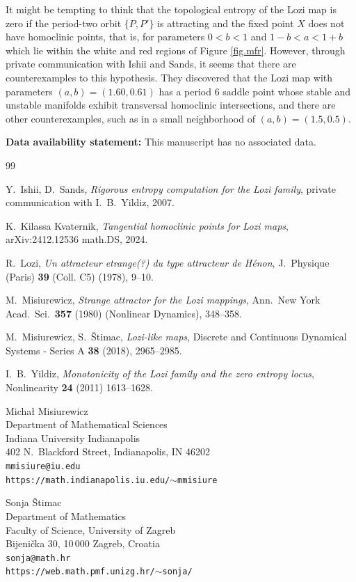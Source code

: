 \documentclass[12pt]{amsart}
\theoremstyle{plain}
\theoremstyle{definition}
\begin{document}
It might be tempting to think that the topological entropy of the Lozi map 
is zero if the period-two orbit $\{ P, P' \}$ is attracting and the fixed 
point $X$ does not have homoclinic points, that is, for parameters $0 < b < 1$ 
and $1 - b < a < 1 + b$ which lie within the white and red regions of 
Figure \ref{fig.mfr}. However, through private communication with Ishii and 
Sands, it seems that there are counterexamples to this hypothesis. They 
discovered that the Lozi map with parameters $(a, b) = (1.60, 0.61)$ has a 
period 6 saddle point whose stable and unstable manifolds exhibit transversal 
homoclinic intersections, and there are other counterexamples, such as in 
a small neighborhood of $(a, b) = (1.5, 0.5)$.

\vspace{1cm}
	
	{\bf Data availability statement:} This manuscript has no associated data.
	
\vspace{1cm}	
	
	\begin{thebibliography}{99}
		
		Y.\ Ishii, D.\ Sands, \emph{Rigorous entropy computation for the Lozi family}, 
		private communication with I.\ B.\ Yildiz, 2007.
		
		K.\ Kilassa Kvaternik, \emph{Tangential homoclinic points for Lozi maps}, 
		arXiv:2412.12536 math.DS, 2024.
		
		R.\ Lozi, \emph{Un attracteur etrange(?) du type attracteur de 
			H\'enon}, J.\ Physique (Paris) {\bf 39} (Coll. C5) (1978), 9--10.
		
		M.\ Misiurewicz, \emph{Strange attractor for the Lozi mappings}, 
		Ann.\ New York Acad.\ Sci.\ {\bf 357} (1980) (Nonlinear Dynamics), 
		348--358.
		
		M.\ Misiurewicz, S.\ \v Stimac, \emph{Lozi-like maps}, Discrete and 
		Continuous Dynamical Systems - Series A {\bf 38} (2018), 2965--2985. 
		
		I.\ B.\ Yildiz, \emph{Monotonicity of the Lozi family and the zero 
			entropy locus}, Nonlinearity {\bf 24} (2011) 1613--1628.
		
	\end{thebibliography}
	
\vspace{1cm}

	\noindent
	Micha{\l} Misiurewicz\\
	Department of Mathematical Sciences\\
	Indiana University Indianapolis\\
	402 N.\ Blackford Street, Indianapolis, IN 46202\\
	\texttt{mmisiure@iu.edu}\\
	\texttt{https://math.indianapolis.iu.edu/$\sim$mmisiure}
	
	\medskip
	\noindent
	Sonja \v Stimac\\
	Department of Mathematics\\
	Faculty of Science, University of Zagreb\\
	Bijeni\v cka 30, 10\,000 Zagreb, Croatia\\
	\texttt{sonja@math.hr}\\
	\texttt{https://web.math.pmf.unizg.hr/$\sim$sonja/}
	
\end{document}
